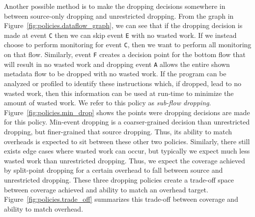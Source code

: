 Another possible method is to make the dropping decisions somewhere in between
source-only dropping and unrestricted dropping. From the graph in 
Figure~\ref{fig:policies.dataflow_graph}, we can see that if the dropping
decision is made at event {\tt C} then we can skip event {\tt E} with no wasted
work. If we instead choose to perform monitoring for event {\tt C}, then we want to perform all
monitoring on that flow. Similarly, event {\tt F} creates a decision point for
the bottom flow that will result in no wasted work and dropping event {\tt A}
allows the entire shown metadata flow to be dropped with no wasted work. If the
program can be
analyzed or profiled to identify these instructions which, if dropped, lead to
no wasted work, then this information can be used at run-time to minimize the
amount of wasted work. We refer to this policy as \emph{sub-flow dropping}.
Figure~\ref{fig:policies.min_drop} shows the points were dropping decisions are
made for this policy.
Min-event dropping is a coarser-grained decision than unrestricted dropping, but
finer-grained that source dropping. Thus, its ability to match overheads is
expected to sit between these other two policies. Similarly, there still exists
edge cases where wasted work can occur, but typically we expect much less
wasted work than unrestricted 
dropping. Thus, we expect the coverage achieved by split-point dropping for a
certain overhead to fall between source and unrestricted dropping. These three
dropping policies create a trade-off space between coverage achieved and
ability to match an overhead target.
Figure~\ref{fig:policies.trade_off} summarizes this trade-off between coverage
and ability to match overhead.

